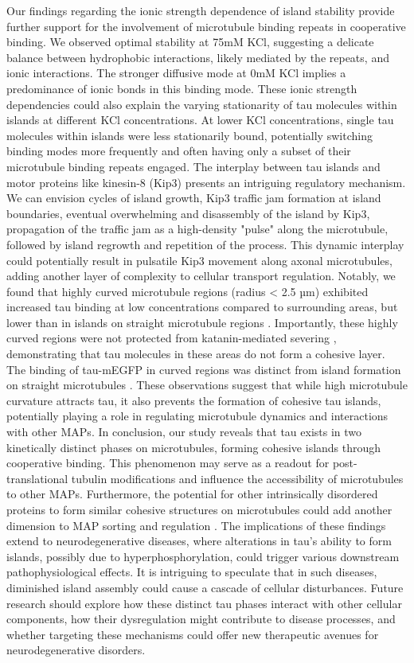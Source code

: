 Our findings regarding the ionic strength dependence of island stability provide further support for the involvement of microtubule binding repeats in cooperative binding. We observed optimal stability at 75mM KCl, suggesting a delicate balance between hydrophobic interactions, likely mediated by the repeats, and ionic interactions. The stronger diffusive mode at 0mM KCl implies a predominance of ionic bonds in this binding mode. These ionic strength dependencies could also explain the varying stationarity of tau molecules within islands at different KCl concentrations. At lower KCl concentrations, single tau molecules within islands were less stationarily bound, potentially switching binding modes more frequently and often having only a subset of their microtubule binding repeats engaged.
The interplay between tau islands and motor proteins like kinesin-8 (Kip3) presents an intriguing regulatory mechanism. We can envision cycles of island growth, Kip3 traffic jam formation at island boundaries, eventual overwhelming and disassembly of the island by Kip3, propagation of the traffic jam as a high-density "pulse" along the microtubule, followed by island regrowth and repetition of the process. This dynamic interplay could potentially result in pulsatile Kip3 movement along axonal microtubules, adding another layer of complexity to cellular transport regulation.
Notably, we found that highly curved microtubule regions (radius < 2.5 µm) exhibited increased tau binding at low concentrations compared to surrounding areas, but lower than in islands on straight microtubule regions . Importantly, these highly curved regions were not protected from katanin-mediated severing , demonstrating that tau molecules in these areas do not form a cohesive layer. The binding of tau-mEGFP in curved regions was distinct from island formation on straight microtubules . These observations suggest that while high microtubule curvature attracts tau, it also prevents the formation of cohesive tau islands, potentially playing a role in regulating microtubule dynamics and interactions with other MAPs.
In conclusion, our study reveals that tau exists in two kinetically distinct phases on microtubules, forming cohesive islands through cooperative binding. This phenomenon may serve as a readout for post-translational tubulin modifications and influence the accessibility of microtubules to other MAPs. Furthermore, the potential for other intrinsically disordered proteins to form similar cohesive structures on microtubules could add another dimension to MAP sorting and regulation \parencite{Monroy2018}.
The implications of these findings extend to neurodegenerative diseases, where alterations in tau's ability to form islands, possibly due to hyperphosphorylation, could trigger various downstream pathophysiological effects. It is intriguing to speculate that in such diseases, diminished island assembly could cause a cascade of cellular disturbances. Future research should explore how these distinct tau phases interact with other cellular components, how their dysregulation might contribute to disease processes, and whether targeting these mechanisms could offer new therapeutic avenues for neurodegenerative disorders.